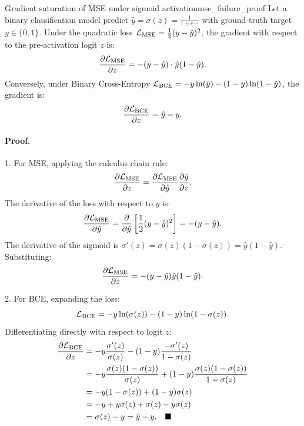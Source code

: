 \documentclass[../../main.tex]{subfiles}
\begin{document}
\begin{theorem}{Gradient saturation of MSE under sigmoid activation}{mse_failure_proof}
Let a binary classification model predict $\hat{y} = \sigma(z) = \frac{1}{1 + e^{-z}}$ with ground-truth target $y \in \{0, 1\}$. Under the quadratic loss $\mathcal{L}_{\text{MSE}} = \frac{1}{2}(y - \hat{y})^2$, the gradient with respect to the pre-activation logit $z$ is:
\begin{equation}
\label{eq:mse_gradient_sat}
\frac{\partial \mathcal{L}_{\text{MSE}}}{\partial z} = - (y - \hat{y}) \cdot \hat{y}(1 - \hat{y}).
\end{equation}
Conversely, under Binary Cross-Entropy $\mathcal{L}_{\text{BCE}} = - y \ln(\hat{y}) - (1 - y) \ln(1 - \hat{y})$, the gradient is:
\begin{equation}
\label{eq:bce_gradient_clean}
\frac{\partial \mathcal{L}_{\text{BCE}}}{\partial z} = \hat{y} - y.
\end{equation}
\end{theorem}

\paragraph{Proof.}
1. For MSE, applying the calculus chain rule:
\begin{equation}
\frac{\partial \mathcal{L}_{\text{MSE}}}{\partial z} = \frac{\partial \mathcal{L}_{\text{MSE}}}{\partial \hat{y}} \frac{\partial \hat{y}}{\partial z}.
\end{equation}
The derivative of the loss with respect to $\hat{y}$ is:
\[
\frac{\partial \mathcal{L}_{\text{MSE}}}{\partial \hat{y}} = \frac{\partial}{\partial \hat{y}} \left[ \frac{1}{2}(y - \hat{y})^2 \right] = -(y - \hat{y}).
\]
The derivative of the sigmoid is $\sigma'(z) = \sigma(z)(1 - \sigma(z)) = \hat{y}(1 - \hat{y})$. Substituting:
\begin{equation}
\frac{\partial \mathcal{L}_{\text{MSE}}}{\partial z} = -(y - \hat{y}) \hat{y}(1 - \hat{y}). \label{eq:mse_grad_derived}
\end{equation}

2. For BCE, expanding the loss:
\begin{equation}
\mathcal{L}_{\text{BCE}} = - y \ln(\sigma(z)) - (1 - y) \ln(1 - \sigma(z)).
\end{equation}
Differentiating directly with respect to logit $z$:
\begin{align*}
\frac{\partial \mathcal{L}_{\text{BCE}}}{\partial z} &= - y \frac{\sigma'(z)}{\sigma(z)} - (1 - y) \frac{-\sigma'(z)}{1 - \sigma(z)} \\
&= - y \frac{\sigma(z)(1 - \sigma(z))}{\sigma(z)} + (1 - y) \frac{\sigma(z)(1 - \sigma(z))}{1 - \sigma(z)} \\
&= - y (1 - \sigma(z)) + (1 - y) \sigma(z) \\
&= - y + y \sigma(z) + \sigma(z) - y \sigma(z) \\
&= \sigma(z) - y = \hat{y} - y. \quad \blacksquare
\end{align*}
\end{document}
